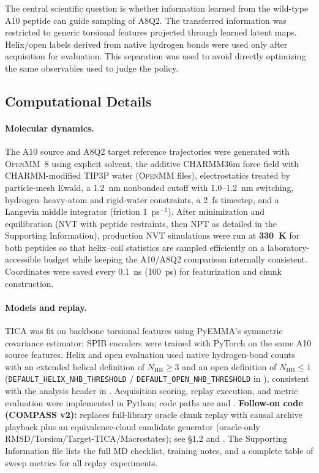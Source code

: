 \documentclass[journal=jctcce,manuscript=article,layout=twocolumn]{achemso}
\begin{document}
The central scientific question is whether information learned from the wild-type A10 peptide can guide sampling of A8Q2. The transferred information was restricted to generic torsional features projected through learned latent maps. Helix/open labels derived from native hydrogen bonds were used only after acquisition for evaluation. This separation was used to avoid directly optimizing the same observables used to judge the policy.

\subsection{Computational Details}

\paragraph{Molecular dynamics.}
The A10 source and A8Q2 target reference trajectories were generated with \textsc{OpenMM}~8\cite{eastman2024openmm8} using explicit solvent, the additive CHARMM36m force field with CHARMM-modified TIP3P water (\textsc{OpenMM}  files),\cite{huang2017charmm36m,kim2015charmmgui} electrostatics treated by particle-mesh Ewald, a 1.2~nm nonbonded cutoff with 1.0--1.2~nm switching, hydrogen--heavy-atom and rigid-water constraints, a 2~fs timestep, and a Langevin middle integrator (friction 1~ps$^{-1}$).
After minimization and equilibration (NVT with peptide restraints, then NPT as detailed in the Supporting Information), production NVT simulations were run at \textbf{330~K} for both peptides so that helix--coil statistics are sampled efficiently on a laboratory-accessible budget while keeping the A10/A8Q2 comparison internally consistent.
Coordinates were saved every 0.1~ns (100~ps) for featurization and chunk construction.

\paragraph{Models and replay.}
TICA was fit on backbone torsional features using PyEMMA's symmetric covariance estimator;\cite{scherer2015pyemma} SPIB encoders were trained with PyTorch on the same A10 source features.
Helix and open evaluation used native hydrogen-bond counts with an extended helical definition of $N_{\mathrm{HB}}\geq 3$ and an open definition of $N_{\mathrm{HB}}\leq 1$ (\texttt{DEFAULT\_HELIX\_NHB\_THRESHOLD} / \texttt{DEFAULT\_OPEN\_NHB\_THRESHOLD} in ), consistent with the analysis header in .
Acquisition scoring, replay execution, and metric evaluation were implemented in Python; code paths are  and .
\textbf{Follow-on code (COMPASS v2):}  replaces full-library oracle chunk replay with causal archive playback plus an equivalence-cloud candidate generator (oracle-only RMSD/Torsion/Target-TICA/Macrostates); see  \S1.2 and .
The Supporting Information file  lists the full MD checklist, training notes, and a complete table of sweep metrics for all replay experiments.
\end{document}
